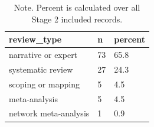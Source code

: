 \begin{table}[htbp]
\raggedright
\caption{Review types among included Stage 2 records.}
\label{tab.review.types}
\begin{tabular}{lll}
\toprule
review\_type & n & percent \\
\midrule
narrative or expert & 73 & 65.8 \\
systematic review & 27 & 24.3 \\
scoping or mapping & 5 & 4.5 \\
meta-analysis & 5 & 4.5 \\
network meta-analysis & 1 & 0.9 \\
\bottomrule
\end{tabular}

\caption*{Note. Percent is calculated over all Stage 2 included records.}
\end{table}
